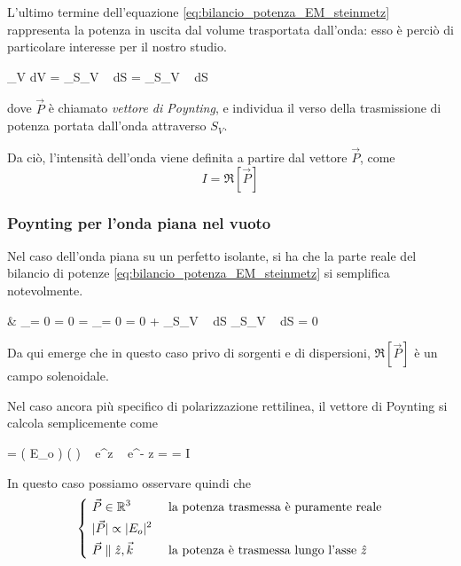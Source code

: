 	L'ultimo termine dell'equazione \ref{eq:bilancio_potenza_EM_steinmetz} rappresenta la potenza in uscita dal volume trasportata dall'onda: esso è perciò di particolare interesse per il nostro studio.

	\begin{esp} \label{eq:def_poynting}
		\int_V  dV
			= \int_{S_V}  \cdot {} ~ dS
			= \int_{S_V}  \cdot {} ~ dS
	\end{esp}
	dove $\vec{P}$ è chiamato \emph{vettore di Poynting}, e individua il verso della trasmissione di potenza portata dall'onda attraverso $S_V$.

	Da ciò, l'intensità dell'onda viene definita a partire dal vettore $\vec{P}$, come
	\begin{equation}
		I = \Re[\vec{P}]
	\end{equation}


	\subsubsection{Poynting per l'onda piana nel vuoto}

		Nel caso dell'onda piana su un perfetto isolante, si ha che la parte reale del bilancio di potenze \ref{eq:bilancio_potenza_EM_steinmetz} si semplifica notevolmente.

		\begin{esp} \label{eq:bilancio_potenza_EM_steinmetz}
			& _{= 0  \jt = 0}
				= _{= 0  \sigma = 0}
				+ \int_{S_V} \Re[\vec{P}] \cdot {} ~ dS
				\implies \int_{S_V} \Re[\vec{P}] \cdot {} ~ dS = 0
		\end{esp}

		Da qui emerge che in questo caso privo di sorgenti e di dispersioni, $\Re[\vec{P}]$ è un campo solenoidale.

		Nel caso ancora più specifico di polarizzazione rettilinea, il vettore di Poynting si calcola semplicemente come
		\begin{esp}
				=  \left( E_o  \right) \times \left(   \right)
					~ e^{\jmath \beta z} ~ e^{- \jmath \beta z}
				=  
				= I 
		\end{esp}

		In questo caso possiamo osservare quindi che
		\begin{equation}
			\begin{dcases}
				~ \vec{P} \in \mathbb{R}^3 & \text{ la potenza trasmessa è puramente reale} \\
				~ |\vec{P}| \propto |E_o|^2 \\
				~ \vec{P} \parallel \hat{z}, \vec{k} & \text{ la potenza è trasmessa lungo l'asse } \hat{z}
			\end{dcases}
		\end{equation}

